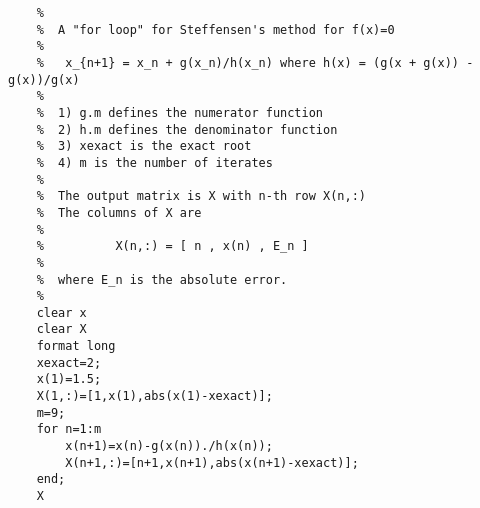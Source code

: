 \documentclass[11pt]{article}
\begin{document}
\begin{Verbatim}
    %
    %  A "for loop" for Steffensen's method for f(x)=0
    %
    %   x_{n+1} = x_n + g(x_n)/h(x_n) where h(x) = (g(x + g(x)) - g(x))/g(x)
    %
    %  1) g.m defines the numerator function
    %  2) h.m defines the denominator function
    %  3) xexact is the exact root
    %  4) m is the number of iterates
    %
    %  The output matrix is X with n-th row X(n,:)
    %  The columns of X are
    %
    %          X(n,:) = [ n , x(n) , E_n ]
    %
    %  where E_n is the absolute error.
    %
    clear x
    clear X
    format long
    xexact=2;
    x(1)=1.5;
    X(1,:)=[1,x(1),abs(x(1)-xexact)];
    m=9;
    for n=1:m
        x(n+1)=x(n)-g(x(n))./h(x(n));
        X(n+1,:)=[n+1,x(n+1),abs(x(n+1)-xexact)];
    end;
    X
\end{Verbatim}
\end{document}
